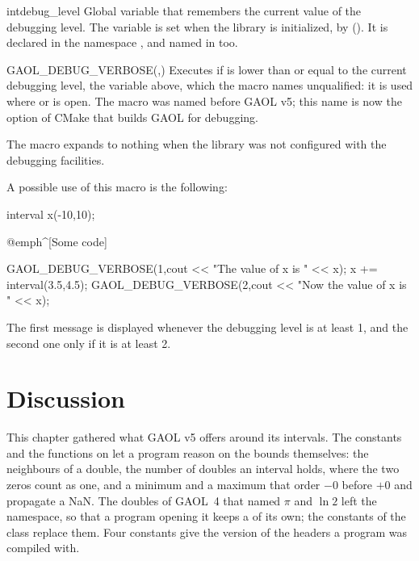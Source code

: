 \begin{deffun}{int}{debug\_level}{}
  Global variable that remembers the current value of the debugging level.
  The variable is set when the library is initialized, by 
  (). It is declared in the namespace ,
  and named in  too.
\end{deffun}

\begin{defmacroA}{GAOL\_DEBUG\_VERBOSE}{(,)}
  Executes  if  is lower than or equal to the current
  debugging level, the variable  above, which the macro names unqualified: it is used where  or  is open. The macro was
  named  before GAOL v5; this name is now the option of
  CMake that builds GAOL for debugging.\newinvfive

  The macro expands to nothing when the library was not configured with the
  debugging facilities.
\end{defmacroA}

\noindent
A possible use of this macro is the following:

\begin{example}
interval x(-10,10);

@emph^[Some code]~

GAOL_DEBUG_VERBOSE(1,cout << "The value of x is " << x);
x += interval(3.5,4.5);
GAOL_DEBUG_VERBOSE(2,cout << "Now the value of x is " << x);
\end{example}

\noindent
The first message is displayed whenever the debugging level is at least 1,
and the second one only if it is at least 2.

\section{Discussion}\label{sec:errors-discussion}

This chapter gathered what GAOL v5 offers around its intervals. The
constants and the functions on  let a program reason on the
bounds themselves: the neighbours of a double, the number of doubles an
interval holds, where the two zeros count as one, and a minimum and a
maximum that order $-0$ before $+0$ and propagate a NaN. The doubles of
GAOL~4 that named $\pi$ and $\ln 2$ left the namespace, so that a program
opening it keeps a  of its own; the constants of the class
 replace them.\newinvfive{} Four constants give the version
of the headers a program was compiled with.

